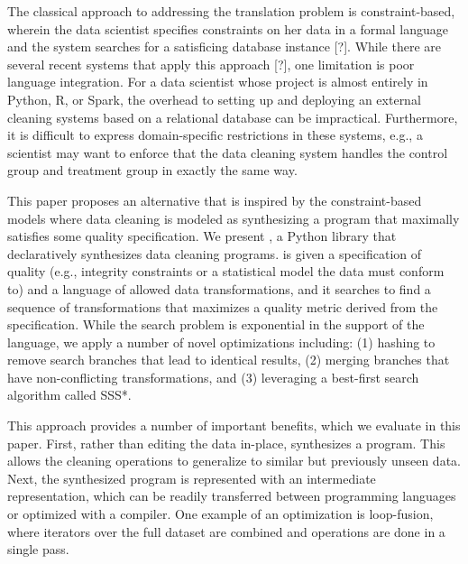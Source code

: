 The classical approach to addressing the translation problem is constraint-based, wherein the data scientist specifies constraints on her data in a formal language and the system searches for a satisficing database instance [?].
While there are several recent systems that apply this approach [?], one limitation is poor language integration.
For a data scientist whose project is almost entirely in Python, R, or Spark, the overhead to setting up and deploying an external cleaning systems based on a relational database can be impractical.
Furthermore, it is difficult to express domain-specific restrictions in these systems, e.g., a scientist may want to enforce that the data cleaning system handles the control group and treatment group in exactly the same way.

This paper proposes an alternative that is inspired by the constraint-based models where data cleaning is modeled as synthesizing a program that maximally satisfies some quality specification.
We present \sys, a Python library that declaratively synthesizes data cleaning programs.  \sys is given a specification of quality (e.g., integrity constraints or a statistical model the data must conform to) and a language  of  allowed  data  transformations,  and  it  searches  to find a sequence of transformations that maximizes a quality metric derived from the specification.  While the search problem is exponential in the support of the language, we apply a number of novel optimizations including:  (1) hashing to remove search branches that lead to identical results, (2) merging branches that have non-conflicting  transformations,  and  (3)  leveraging  a best-first search algorithm called SSS*.


This approach provides a number of important benefits, which we evaluate in this paper.
First, rather than editing the data in-place, \sys synthesizes a program.
This allows the cleaning operations to generalize to similar but previously unseen data.
Next, the synthesized program is represented with an intermediate representation, which can be readily transferred  between  programming languages  or  optimized  with  a compiler.
One example of an optimization is loop-fusion, where iterators over the full dataset are combined and operations are done in a single pass.









